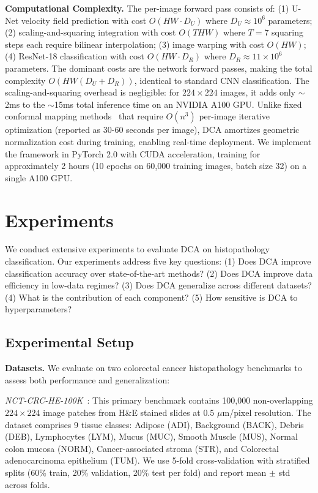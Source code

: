 \documentclass[final,3p,times,review,sort&compress]{elsarticle}
\begin{document}
\textbf{Computational Complexity.} The per-image forward pass consists of: (1) U-Net velocity field prediction with cost $O(HW \cdot D_U)$ where $D_U \approx 10^6$ parameters; (2) scaling-and-squaring integration with cost $O(THW)$ where $T=7$ squaring steps each require bilinear interpolation; (3) image warping with cost $O(HW)$; (4) ResNet-18 classification with cost $O(HW \cdot D_R)$ where $D_R \approx 11 \times 10^6$ parameters. The dominant costs are the network forward passes, making the total complexity $O(HW(D_U + D_R))$, identical to standard CNN classification. The scaling-and-squaring overhead is negligible: for $224 \times 224$ images, it adds only $\sim$2ms to the $\sim$15ms total inference time on an NVIDIA A100 GPU. Unlike fixed conformal mapping methods~\cite{huang2024surface} that require $O(n^3)$ per-image iterative optimization (reported as 30-60 seconds per image), DCA amortizes geometric normalization cost during training, enabling real-time deployment. We implement the framework in PyTorch 2.0 with CUDA acceleration, training for approximately 2 hours (10 epochs on 60,000 training images, batch size 32) on a single A100 GPU.

\section{Experiments}
\label{sec:experiments}

We conduct extensive experiments to evaluate DCA on histopathology classification. Our experiments address five key questions: (1) Does DCA improve classification accuracy over state-of-the-art methods? (2) Does DCA improve data efficiency in low-data regimes? (3) Does DCA generalize across different datasets? (4) What is the contribution of each component? (5) How sensitive is DCA to hyperparameters?

\subsection{Experimental Setup}

\textbf{Datasets.} We evaluate on two colorectal cancer histopathology benchmarks to assess both performance and generalization:

\textit{NCT-CRC-HE-100K}~\cite{nct_dataset}: This primary benchmark contains 100,000 non-overlapping $224 \times 224$ image patches from H\&E stained slides at 0.5 $\mu$m/pixel resolution. The dataset comprises 9 tissue classes: Adipose (ADI), Background (BACK), Debris (DEB), Lymphocytes (LYM), Mucus (MUC), Smooth Muscle (MUS), Normal colon mucosa (NORM), Cancer-associated stroma (STR), and Colorectal adenocarcinoma epithelium (TUM). We use 5-fold cross-validation with stratified splits (60\% train, 20\% validation, 20\% test per fold) and report mean $\pm$ std across folds.
\end{document}
